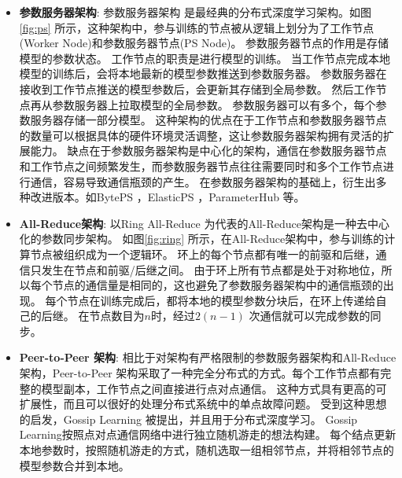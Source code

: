 \begin{itemize}
	\item \textbf{参数服务器架构}: 参数服务器架构  是最经典的分布式深度学习架构。如图 \ref{fig:ps} 所示，这种架构中，参与训练的节点被从逻辑上划分为了工作节点(Worker Node)和参数服务器节点(PS Node)。
	参数服务器节点的作用是存储模型的参数状态。
	工作节点的职责是进行模型的训练。
	当工作节点完成本地模型的训练后，会将本地最新的模型参数推送到参数服务器。
	参数服务器在接收到工作节点推送的模型参数后，会更新其存储到全局参数。
	然后工作节点再从参数服务器上拉取模型的全局参数。
	参数服务器可以有多个，每个参数服务器存储一部分模型。
	这种架构的优点在于工作节点和参数服务器节点的数量可以根据具体的硬件环境灵活调整，这让参数服务器架构拥有灵活的扩展能力。
	缺点在于参数服务器架构是中心化的架构，通信在参数服务器节点和工作节点之间频繁发生，而参数服务器节点往往需要同时和多个工作节点进行通信，容易导致通信瓶颈的产生。
	在参数服务器架构的基础上，衍生出多种改进版本。如BytePS ，ElasticPS ，ParameterHub 等。

	\item \textbf{All-Reduce架构}: 以Ring All-Reduce  为代表的All-Reduce架构是一种去中心化的参数同步架构。
	如图\ref{fig:ring} 所示，在All-Reduce架构中，参与训练的计算节点被组织成为一个逻辑环。
	环上的每个节点都有唯一的前驱和后继，通信只发生在节点和前驱/后继之间。
	由于环上所有节点都是处于对称地位，所以每个节点的通信量是相同的，这也避免了参数服务器架构中的通信瓶颈的出现。
	每个节点在训练完成后，都将本地的模型参数分块后，在环上传递给自己的后继。
	在节点数目为$n$时，经过$2(n-1)$ 次通信就可以完成参数的同步。

	\item \textbf{Peer-to-Peer 架构}: 相比于对架构有严格限制的参数服务器架构和All-Reduce架构，Peer-to-Peer 架构采取了一种完全分布式的方式。每个工作节点都有完整的模型副本，工作节点之间直接进行点对点通信。
	这种方式具有更高的可扩展性，而且可以很好的处理分布式系统中的单点故障问题。
	受到这种思想的启发，Gossip Learning  被提出，并且用于分布式深度学习。
	Gossip Learning按照点对点通信网络中进行独立随机游走的想法构建。
	每个结点更新本地参数时，按照随机游走的方式，随机选取一组相邻节点，并将相邻节点的模型参数合并到本地。

\end{itemize}

